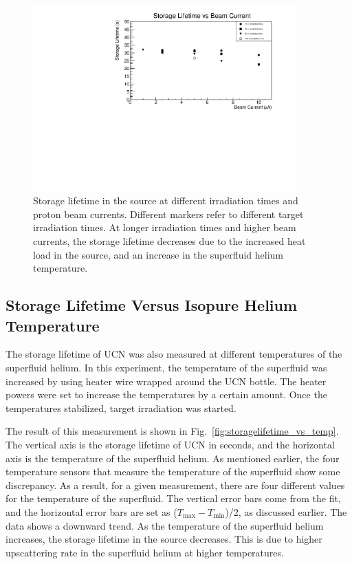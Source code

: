 \begin{figure}[h!]
  \centering
  \includegraphics[width=0.9\textwidth]{StorageLifetime_17009_and_17009A.pdf}
  \caption[UCN storage lifetime at different irradiation times and
  proton beam currents]{Storage lifetime in the source at different
    irradiation times and proton beam currents. Different markers
    refer to different target irradiation times. At longer irradiation
    times and higher beam currents, the storage lifetime decreases due
    to the increased heat load in the source, and an increase in the
    superfluid helium temperature.}
  \label{fig:storage_beam_irrad}
\end{figure}


\subsection{Storage Lifetime Versus Isopure Helium Temperature}
The storage lifetime of UCN was also measured at different
temperatures of the superfluid helium. In this experiment, the
temperature of the superfluid was increased by using heater wire
wrapped around the UCN bottle. The heater powers were set to increase
the temperatures by a certain amount. Once the temperatures
stabilized, target irradiation was started.

The result of this measurement is shown in
Fig.~\ref{fig:storagelifetime_vs_temp}. The vertical axis is the
storage lifetime of UCN in seconds, and the horizontal axis is the
temperature of the superfluid helium. As mentioned earlier, the four
temperature sensors that measure the temperature of the superfluid
show some discrepancy. As a result, for a given measurement, there are
four different values for the temperature of the superfluid. The
vertical error bars come from the fit, and the horizontal error bars
are set as ($T_{\mathrm{max}} - T_{\mathrm{min}}$)/2, as discussed
earlier. The data shows a downward trend. As the temperature of the
superfluid helium increases, the storage lifetime in the source
decreases. This is due to higher upscattering rate in the superfluid
helium at higher temperatures.


